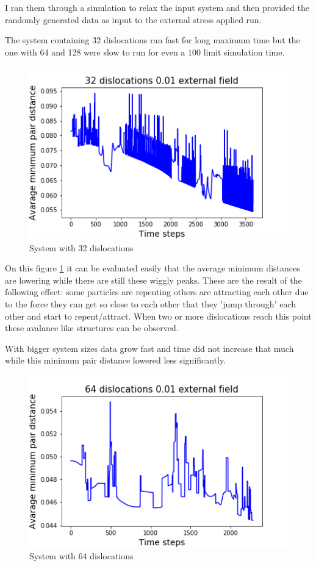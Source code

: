 \documentclass[12pt,a4paper]{article}
\theoremstyle{plain}
\begin{document}
\begin{multicols*}{2}
	\par I ran them through a simulation to relax the input system and then provided the randomly
	generated data as input to the external stress applied run.

	\par The system containing 32 dislocations ran fast for long maximum time but the one with 64 and 128 were slow to run
	for even a $100$ limit simulation time.

	\begin{figure}[H]
		\centering
		\includegraphics[width=0.8\columnwidth]{./32.png}
		\caption{System with 32 dislocations}
		\label{fig:32}
	\end{figure}

	\par On this figure \ref{fig:32} it can be evaluated easily that the average minimum distances
	are lowering while there are still these wiggly peaks. These are the result of the following effect:
	some particles are repenting others are attracting each other due to the force they can get so close
	to each other that they 'jump through' each other and start to repent/attract. When two or more
	dislocations reach this point these avalance like structures can be observed.

	\par With bigger system sizes data grow fast and time did not increase that much while this
	minimum pair distance lowered less significantly.

	\begin{figure}[H]
		\centering
		\includegraphics[width=0.8\columnwidth]{./64.png}
		\caption{System with 64 dislocations}
	\end{figure}


\end{multicols*}
\end{document}
